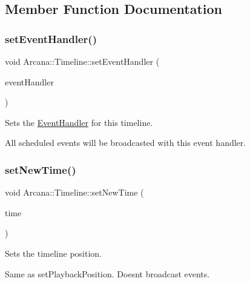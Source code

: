 \subsection{Member Function Documentation}
\mbox{\label{class_arcana_1_1_timeline_acf36a46fcebfed3097b12e2f90ed6ccd}} 
\subsubsection{\texorpdfstring{set\+Event\+Handler()}{setEventHandler()}}
{\footnotesize\ttfamily void Arcana\+::\+Timeline\+::set\+Event\+Handler (\begin{DoxyParamCaption}\item[{\mbox{\hyperlink{class_arcana_1_1_event_handler}{Event\+Handler}} \&}]{event\+Handler }\end{DoxyParamCaption})}



Sets the \mbox{\hyperlink{class_arcana_1_1_event_handler}{Event\+Handler}} for this timeline. 

All scheduled events will be broadcasted with this event handler. \mbox{\label{class_arcana_1_1_timeline_a54c3355a9f97c5173a3b7b0bb5146647}} 
\subsubsection{\texorpdfstring{set\+New\+Time()}{setNewTime()}}
{\footnotesize\ttfamily void Arcana\+::\+Timeline\+::set\+New\+Time (\begin{DoxyParamCaption}\item[{double}]{time }\end{DoxyParamCaption})}



Sets the timeline position. 

Same as set\+Playback\+Position. Doesn\textquotesingle{}t broadcast events. \mbox{\label{class_arcana_1_1_timeline_afba20a0d02f23e9bbf752f6c1a7a589b}} 
